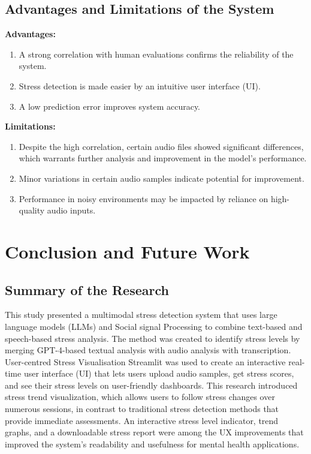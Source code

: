 \documentclass[Arial,12pt,openright,twoside]{book}
\begin{document}
\section{Advantages and Limitations of the System}
\textbf{Advantages:}
\begin{enumerate}
    \item A strong correlation with human evaluations confirms the reliability of the system.
    \item Stress detection is made easier by an intuitive user interface (UI).
    \item A low prediction error improves system accuracy.
\end{enumerate}
\textbf{Limitations:}
\begin{enumerate}
\item  Despite the high correlation, certain audio files showed significant differences, which warrants further analysis and improvement in the model's performance.
    \item Minor variations in certain audio samples indicate potential for improvement.
    \item Performance in noisy environments may be impacted by reliance on high-quality audio inputs.
\end{enumerate}
\chapter{Conclusion and Future Work}
\clearpage 
  \section{Summary of the Research}
  This study presented a multimodal stress detection system that uses large language models (LLMs) and Social signal Processing to combine text-based and speech-based stress analysis. The method was created to identify stress levels by merging GPT-4-based textual analysis with audio analysis with transcription. User-centred Stress Visualisation Streamlit was used to create an interactive real-time user interface (UI) that lets users upload audio samples, get stress scores, and see their stress levels on user-friendly dashboards. This research introduced stress trend visualization, which allows users to follow stress changes over numerous sessions, in contrast to traditional stress detection methods that provide immediate assessments. An interactive stress level indicator, trend graphs, and a downloadable stress report were among the UX improvements that improved the system's readability and usefulness for mental health applications. %
\end{document}

